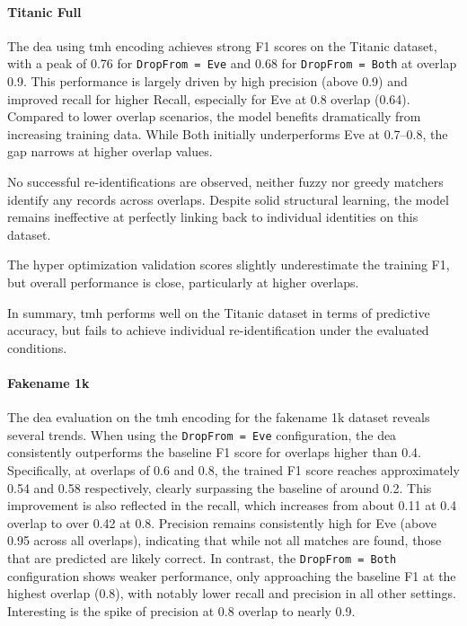 \paragraph{Titanic Full}

The \ac{dea} using \ac{tmh} encoding achieves strong F1 scores on the Titanic dataset, with a peak of 0.76 for \texttt{DropFrom = Eve} and 0.68 for \texttt{DropFrom = Both} at overlap 0.9.
This performance is largely driven by high precision (above 0.9) and improved recall for higher Recall, especially for Eve at 0.8 overlap (0.64).
Compared to lower overlap scenarios, the model benefits dramatically from increasing training data.
While Both initially underperforms Eve at 0.7–0.8, the gap narrows at higher overlap values.

No successful re-identifications are observed, neither fuzzy nor greedy matchers identify any records across overlaps.
Despite solid structural learning, the model remains ineffective at perfectly linking back to individual identities on this dataset.

The hyper optimization validation scores slightly underestimate the training F1, but overall performance is close, particularly at higher overlaps.

In summary, \ac{tmh} performs well on the Titanic dataset in terms of predictive accuracy, but fails to achieve individual re-identification under the evaluated conditions.


\paragraph{Fakename 1k}

The \ac{dea} evaluation on the \ac{tmh} encoding for the fakename 1k dataset reveals several trends.
When using the \texttt{DropFrom = Eve} configuration, the \ac{dea} consistently outperforms the baseline F1 score for overlaps higher than 0.4.
Specifically, at overlaps of 0.6 and 0.8, the trained F1 score reaches approximately 0.54 and 0.58 respectively, clearly surpassing the baseline of around 0.2.
This improvement is also reflected in the recall, which increases from about 0.11 at 0.4 overlap to over 0.42 at 0.8.
Precision remains consistently high for Eve (above 0.95 across all overlaps), indicating that while not all matches are found, those that are predicted are likely correct.
In contrast, the \texttt{DropFrom = Both} configuration shows weaker performance, only approaching the baseline F1 at the highest overlap (0.8), with notably lower recall and precision in all other settings.
Interesting is the spike of precision at 0.8 overlap to nearly 0.9.

